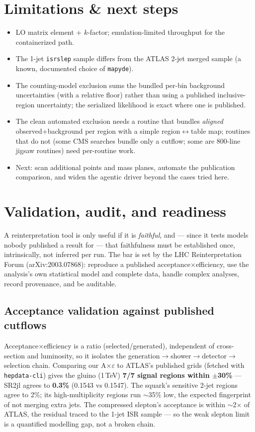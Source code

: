\documentclass[11pt,oneside]{report}
\newcommand{\code}[1]{\texttt{#1}}
\begin{document}
\chapter{Limitations \& next steps}
\begin{itemize}[nosep]
  \item LO matrix element + $k$-factor; emulation-limited throughput for the containerized path.
  \item The 1-jet \code{isrslep} sample differs from the ATLAS 2-jet merged sample (a known,
        documented choice of \code{mapyde}).
  \item The counting-model exclusion sums the bundled per-bin background uncertainties (with a
        relative floor) rather than using a published inclusive-region uncertainty; the serialized
        likelihood is exact where one is published.
  \item The clean automated exclusion needs a routine that bundles \emph{aligned} observed+background
        per region with a simple region$\leftrightarrow$table map; routines that do not (some CMS
        searches bundle only a cutflow; some are 800-line jigsaw routines) need per-routine work.
  \item Next: scan additional points and mass planes, automate the publication comparison, and widen
        the agentic driver beyond the cases tried here.
\end{itemize}

\chapter{Validation, audit, and readiness}
A reinterpretation tool is only useful if it is \emph{faithful}, and --- since it tests models nobody
published a result for --- that faithfulness must be established once, intrinsically, not inferred
per run. The bar is set by the LHC Reinterpretation Forum (arXiv:2003.07868): reproduce a published
acceptance$\times$efficiency, use the analysis's own statistical model and complete data, handle
complex analyses, record provenance, and be auditable.

\section{Acceptance validation against published cutflows}
Acceptance$\times$efficiency is a ratio (selected/generated), independent of cross-section and
luminosity, so it isolates the generation$\to$shower$\to$detector$\to$selection chain. Comparing our
A$\times\varepsilon$ to ATLAS's published grids (fetched with \code{hepdata-cli}) gives the gluino
(1\,TeV) \textbf{7/7 signal regions within $\pm$30\%} --- SR2jl agrees to \textbf{0.3\%} (0.1543 vs
0.1547). The squark's sensitive 2-jet regions agree to 2\%; its high-multiplicity regions run $\sim$35\%
low, the expected fingerprint of not merging extra jets. The compressed slepton's acceptance is within
$\sim$2$\times$ of ATLAS, the residual traced to the 1-jet ISR sample --- so the weak slepton limit is
a quantified modelling gap, not a broken chain.
\end{document}
